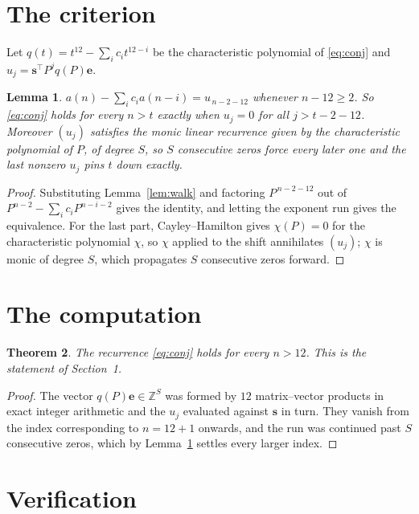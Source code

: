 \documentclass[11pt,a4paper]{article}
\theoremstyle{plain}
\newtheorem{theorem}{Theorem}
\newtheorem{lemma}[theorem]{Lemma}
\theoremstyle{definition}
\begin{document}
\section{The criterion}

Let $q(t)=t^{12}-\sum_i c_i t^{12-i}$ be the characteristic polynomial of
\eqref{eq:conj} and $u_j=\mathbf{s}^{\!\top}P^{j}q(P)\mathbf{e}$.

\begin{lemma}\label{lem:crit}
$a(n)-\sum_i c_i a(n-i)=u_{\,n-2-12}$ whenever $n-12\ge2$. So \eqref{eq:conj}
holds for every $n>t$ exactly when $u_j=0$ for all $j>t-2-12$. Moreover $(u_j)$
satisfies the monic linear recurrence given by the characteristic polynomial of $P$, of
degree $S$, so $S$ consecutive zeros force every later one and the last nonzero $u_j$ pins
$t$ down exactly.
\end{lemma}

\begin{proof}
Substituting Lemma~\ref{lem:walk} and factoring $P^{\,n-2-12}$ out of
$P^{n-2}-\sum_i c_i P^{n-i-2}$ gives the identity, and letting the exponent run gives the
equivalence. For the last part, Cayley--Hamilton gives $\chi(P)=0$ for the characteristic
polynomial $\chi$, so $\chi$ applied to the shift annihilates $(u_j)$; $\chi$ is monic of
degree $S$, which propagates $S$ consecutive zeros forward.
\end{proof}

\section{The computation}

\begin{theorem}
The recurrence \eqref{eq:conj} holds for every $n>12$. This is the statement of
Section~1.
\end{theorem}

\begin{proof}
The vector $q(P)\mathbf{e}\in\mathbb{Z}^{S}$ was formed by $12$ matrix--vector
products in exact integer arithmetic and the $u_j$ evaluated against $\mathbf{s}$ in turn.
They vanish from the index corresponding to $n=12+1$ onwards, and the run was continued
past $S$ consecutive zeros, which by Lemma~\ref{lem:crit} settles every larger index.
\end{proof}

\section{Verification}
\end{document}
